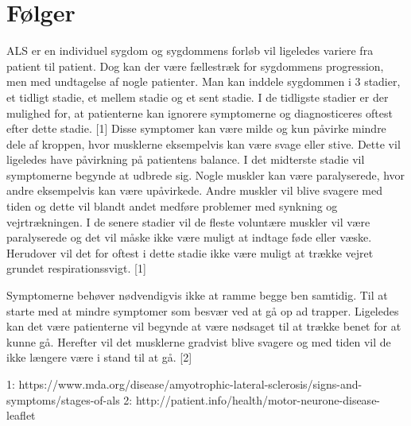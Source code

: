 \section{Følger}

ALS er en individuel sygdom og sygdommens forløb vil ligeledes variere fra patient til patient. Dog kan der være fællestræk for sygdommens progression, men med undtagelse af nogle patienter. Man kan inddele sygdommen i 3 stadier, et tidligt stadie, et mellem stadie og et sent stadie. I de tidligste stadier er der mulighed for, at patienterne kan ignorere symptomerne og diagnosticeres oftest efter dette stadie. [1] Disse symptomer kan være milde og kun påvirke mindre dele af kroppen, hvor musklerne eksempelvis kan være svage eller stive. Dette vil ligeledes have påvirkning på patientens balance. I det midterste stadie vil symptomerne begynde at udbrede sig. Nogle muskler kan være paralyserede, hvor andre eksempelvis kan være upåvirkede. Andre muskler vil blive svagere med tiden og dette vil blandt andet medføre problemer med synkning og vejrtrækningen. I de senere stadier vil de fleste voluntære muskler vil være paralyserede og det vil måske ikke være muligt at indtage føde eller væske. Herudover vil det for oftest i dette stadie ikke være muligt at trække vejret grundet respirationssvigt. [1] 

Symptomerne behøver nødvendigvis ikke at ramme begge ben samtidig. Til at starte med at mindre symptomer som besvær ved at gå op ad trapper. Ligeledes kan det være patienterne vil begynde at være nødsaget til at trække benet for at kunne gå. Herefter vil det musklerne gradvist blive svagere og med tiden vil de ikke længere være i stand til at gå. [2]



1: https://www.mda.org/disease/amyotrophic-lateral-sclerosis/signs-and-symptoms/stages-of-als 
2: http://patient.info/health/motor-neurone-disease-leaflet 
